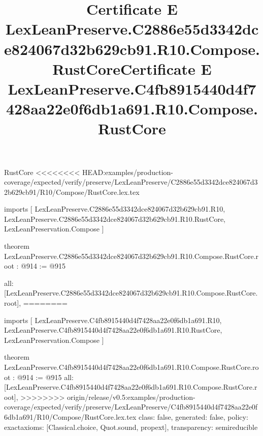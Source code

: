 \begin{lexlean}{RustCore}
<<<<<<<< HEAD:examples/production-coverage/expected/verify/preserve/LexLeanPreserve/C2886e55d3342dce824067d32b629cb91/R10/Compose/RustCore.lex.tex
\title{Certificate E LexLeanPreserve.C2886e55d3342dce824067d32b629cb91.R10.Compose.RustCore}
\begin{coremodule}
imports [
  LexLeanPreserve.C2886e55d3342dce824067d32b629cb91.R10,
  LexLeanPreserve.C2886e55d3342dce824067d32b629cb91.R10.RustCore,
  LexLeanPreservation.Compose
]

theorem LexLeanPreserve.C2886e55d3342dce824067d32b629cb91.R10.Compose.RustCore.root : @914 := @915 {
  all: [LexLeanPreserve.C2886e55d3342dce824067d32b629cb91.R10.Compose.RustCore.root],
========
\title{Certificate E LexLeanPreserve.C4fb8915440d4f7428aa22e0f6db1a691.R10.Compose.RustCore}
\begin{coremodule}
imports [
  LexLeanPreserve.C4fb8915440d4f7428aa22e0f6db1a691.R10,
  LexLeanPreserve.C4fb8915440d4f7428aa22e0f6db1a691.R10.RustCore,
  LexLeanPreservation.Compose
]

theorem LexLeanPreserve.C4fb8915440d4f7428aa22e0f6db1a691.R10.Compose.RustCore.root : @914 := @915 {
  all: [LexLeanPreserve.C4fb8915440d4f7428aa22e0f6db1a691.R10.Compose.RustCore.root],
>>>>>>>> origin/release/v0.5:examples/production-coverage/expected/verify/preserve/LexLeanPreserve/C4fb8915440d4f7428aa22e0f6db1a691/R10/Compose/RustCore.lex.tex
  class: false,
  generated: false,
  policy: exact{axioms: [Classical.choice, Quot.sound, propext]},
  transparency: semireducible
}


\end{coremodule}}
\end{coremodule}
\end{lexlean}
